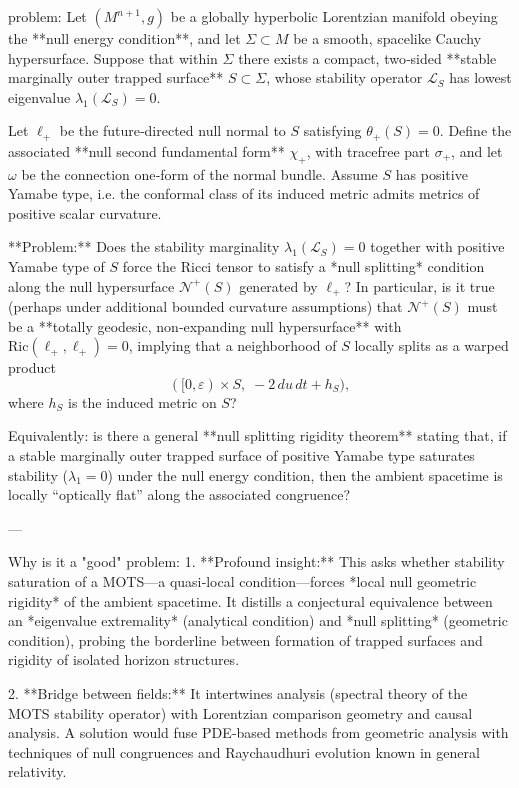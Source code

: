 problem:  
Let \((M^{n+1}, g)\) be a globally hyperbolic Lorentzian manifold obeying the **null energy condition**, and let \(\Sigma \subset M\) be a smooth, spacelike Cauchy hypersurface. Suppose that within \(\Sigma\) there exists a compact, two‑sided **stable marginally outer trapped surface** \(S \subset \Sigma\), whose stability operator \(\mathcal L_S\) has lowest eigenvalue \(\lambda_1(\mathcal L_S) = 0\).  

Let \(\ell_+\) be the future‑directed null normal to \(S\) satisfying \(\theta_+(S)=0\). Define the associated **null second fundamental form** \(\chi_+\), with tracefree part \(\sigma_+\), and let \(\omega\) be the connection one‑form of the normal bundle. Assume \(S\) has positive Yamabe type, i.e. the conformal class of its induced metric admits metrics of positive scalar curvature.

**Problem:**  
Does the stability marginality \(\lambda_1(\mathcal L_S)=0\) together with positive Yamabe type of \(S\) force the Ricci tensor to satisfy a *null splitting* condition along the null hypersurface \(\mathcal N^+(S)\) generated by \(\ell_+\)?  In particular, is it true (perhaps under additional bounded curvature assumptions) that \(\mathcal N^+(S)\) must be a **totally geodesic, non‑expanding null hypersurface** with \(\mathrm{Ric}(\ell_+, \ell_+) = 0\), implying that a neighborhood of \(S\) locally splits as a warped product
\[
([0,\varepsilon) \times S,\; -2\,du\,dt + h_S),
\]
where \(h_S\) is the induced metric on \(S\)?  

Equivalently: is there a general **null splitting rigidity theorem** stating that, if a stable marginally outer trapped surface of positive Yamabe type saturates stability (\(\lambda_1=0\)) under the null energy condition, then the ambient spacetime is locally “optically flat” along the associated congruence?

---

Why is it a "good" problem:  
1. **Profound insight:**  
This asks whether stability saturation of a MOTS—a quasi‑local condition—forces *local null geometric rigidity* of the ambient spacetime. It distills a conjectural equivalence between an *eigenvalue extremality* (analytical condition) and *null splitting* (geometric condition), probing the borderline between formation of trapped surfaces and rigidity of isolated horizon structures.

2. **Bridge between fields:**  
It intertwines analysis (spectral theory of the MOTS stability operator) with Lorentzian comparison geometry and causal analysis. A solution would fuse PDE‑based methods from geometric analysis with techniques of null congruences and Raychaudhuri evolution known in general relativity.

